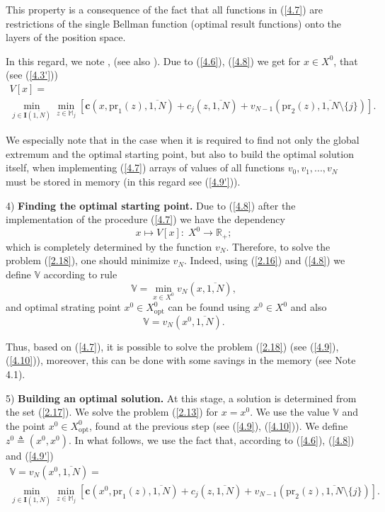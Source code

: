 \documentclass[numbers,sort&compress]{IntechOpen-Book}%
\begin{document}
This property is a consequence of the fact
that all functions in
 (\ref{4.7}) are restrictions of the single Bellman function
(optimal result functions)
onto the layers of the position space.

In this regard, we note
\cite[$\S$4.9]{14}, \cite{18}
(see also \cite[(4.3.1)]{4}).
Due to (\ref{4.6}), (\ref{4.8})
we get for
$x \in X^0$,
that
(see  (\ref{4.3'}))
\begin{multline}
  \label{4.9'}
  V[x] = \\
  \min\limits_{j \in \mathbf{I}(\overline{1,N})} \min\limits_{z \in \mathbb{M}_j}
  [\mathbf{c}(x,\mathrm{pr}_1(z),\overline{1,N}) + c_j(z,\overline{1,N}) + v_{N-1}(\mathrm{pr}_2(z),\overline{1,N} \setminus \{j\})].
\end{multline}

We especially note that in the case
when it is required to find not only the global extremum
and the optimal starting point,
but also to build the optimal solution itself,
when implementing  (\ref{4.7})
arrays of values of all functions
$v_0,v_1,...,v_N$
must be stored in memory
(in this regard see  (\ref{4.9'})).

4) {\bf Finding the optimal starting point.}
Due to
 (\ref{4.8})
after the implementation of the procedure
 (\ref{4.7}) we have the dependency
$$
  x \longmapsto V[x]:\;X^0 \longrightarrow \mathbb{R}_+;
$$
which is completely determined by the function
$v_N$.
Therefore, to solve the problem  (\ref{2.18}), one should minimize
$v_N$.
Indeed,
using  (\ref{2.16}) and  (\ref{4.8})
we define
$\mathbb{V}$
according to rule
\begin{equation}\label{4.9}
  \mathbb{V} = \min\limits_{x \in X^0} v_N(x,\overline{1,N}),
\end{equation}
and optimal strating point
$x^0 \in X^0_{\mathrm{opt}}$
can be found using
$x^0 \in X^0$ and also
\begin{equation}\label{4.10}
  \mathbb{V} = v_N(x^0,\overline{1,N}).
\end{equation}

Thus,
based on  (\ref{4.7}),
it is possible to
solve the problem  (\ref{2.18})
(see  (\ref{4.9}),  (\ref{4.10})),
moreover,
this can be done with some savings in the memory
(see Note 4.1).

5) {\bf Building an optimal solution.}
At this stage, a solution is determined from the set  (\ref{2.17}).
We solve the problem
 (\ref{2.13})
for
$x=x^0$.
We use the value
$\mathbb{V}$
and the point
$x^0 \in X^0_{\mathrm{opt}}$,
found at the previous step
(see  (\ref{4.9}),  (\ref{4.10})).
We define $z^0 {\triangleq} (x^0,x^0)$.
In what follows, we use the fact that, according to
 (\ref{4.6}),  (\ref{4.8}) and  (\ref{4.9'})
\begin{multline}
  \label{4.11}
  \mathbb{V} = v_N(x^0,\overline{1,N}) = \\
  \min\limits_{j \in \mathbf{I}(\overline{1,N})}
  \min\limits_{z \in \mathbb{M}_j}
  [\mathbf{c}(x^0,\mathrm{pr}_1(z),\overline{1,N}) + c_j(z,\overline{1,N}) + v_{N-1}(\mathrm{pr}_2(z),\overline{1,N} \setminus \{j\})].
\end{multline}
\end{document}
